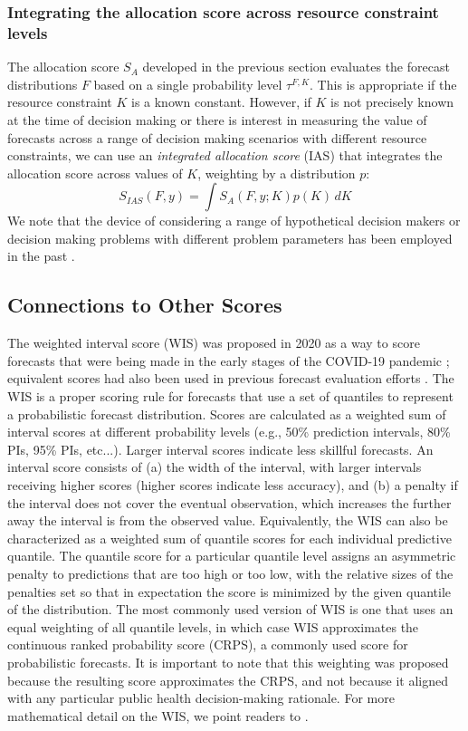 \documentclass{article}\usepackage[]{graphicx}\usepackage[]{xcolor}
\begin{document}
\subsubsection{Integrating the allocation score across resource constraint levels}{}
\label{sec:methods.detailed.integrated_allocation}

The allocation score $S_A$ developed in the previous section evaluates the forecast distributions
$F$ based on a single probability level $\tau^{F,K}$. This is appropriate if the resource constraint $K$ is a known
constant. However, if $K$ is not precisely known at the time of decision making or there is interest in measuring the
value of forecasts across a range of decision making scenarios with different resource constraints, we can use an
\emph{integrated allocation score} (IAS) that integrates the allocation score across values of $K$, weighting by a
distribution $p$:
$$S_{IAS}(F, y) = \int S_A(F,y; K) p(K) \, dK$$
We note that the device of considering a range of hypothetical decision makers or decision making problems with
different problem parameters has been employed in the past \cite[e.g.,][]{murphy1993whatisagoodforecast}.

\subsection{Connections to Other Scores}
\label{sec:methods.related}

The weighted interval score (WIS) was proposed in 2020 as a way to score forecasts that were being made in the early
stages of the COVID-19 pandemic \citep{bracher2021evaluating}; equivalent scores had also been used in previous forecast
evaluation efforts \cite[e.g.,][]{hong2016probabilisticEnergyForecasting}. The WIS is a proper scoring rule for
forecasts that use a set of quantiles to represent a probabilistic forecast distribution. Scores are calculated as a weighted sum of
interval scores at different probability levels (e.g., 50\% prediction intervals, 80\% PIs, 95\% PIs, etc...). Larger
interval scores indicate less skillful forecasts. An interval score consists of (a) the width of the interval, with
larger intervals receiving higher scores (higher scores indicate less accuracy), and (b) a penalty if the interval does
not cover the eventual observation, which increases the further away the interval is from the observed value.
Equivalently, the WIS can also be characterized as a weighted sum of quantile scores for each individual predictive
quantile. The quantile score for a particular quantile level assigns an asymmetric penalty to predictions that are too
high or too low, with the relative sizes of the penalties set so that in expectation the score is minimized by the given
quantile of the distribution. The most commonly used version of WIS is one that uses an equal weighting of all quantile
levels, in which case WIS approximates the continuous ranked probability score (CRPS), a commonly used score for
probabilistic forecasts. It is important to note that this weighting was proposed because the resulting score
approximates the CRPS, and not because it aligned with any particular public health decision-making rationale. For more mathematical detail on the WIS, we point readers to \cite{bracher2021evaluating}.
\end{document}
